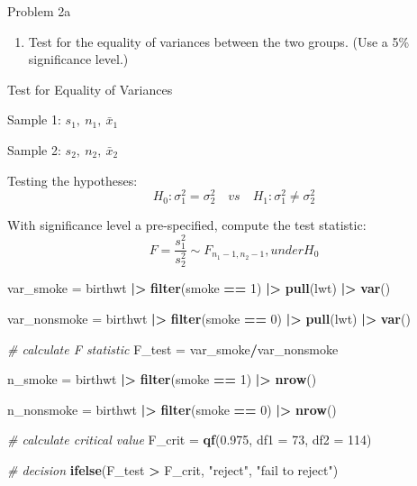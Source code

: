 \documentclass[
]{article}
\newenvironment{Shaded}{\begin{snugshade}}{\end{snugshade}}
\newcommand{\AttributeTok}[1]{\textcolor[rgb]{0.13,0.29,0.53}{#1}}
\newcommand{\CommentTok}[1]{\textcolor[rgb]{0.56,0.35,0.01}{\textit{#1}}}
\newcommand{\DecValTok}[1]{\textcolor[rgb]{0.00,0.00,0.81}{#1}}
\newcommand{\FloatTok}[1]{\textcolor[rgb]{0.00,0.00,0.81}{#1}}
\newcommand{\FunctionTok}[1]{\textcolor[rgb]{0.13,0.29,0.53}{\textbf{#1}}}
\newcommand{\NormalTok}[1]{#1}
\newcommand{\OtherTok}[1]{\textcolor[rgb]{0.56,0.35,0.01}{#1}}
\newcommand{\SpecialCharTok}[1]{\textcolor[rgb]{0.81,0.36,0.00}{\textbf{#1}}}
\newcommand{\StringTok}[1]{\textcolor[rgb]{0.31,0.60,0.02}{#1}}
\providecommand{\tightlist}{%
  \setlength{\itemsep}{0pt}\setlength{\parskip}{0pt}}
\begin{document}
Problem 2a

\begin{enumerate}
\def\labelenumi{\alph{enumi})}
\tightlist
\item
  Test for the equality of variances between the two groups. (Use a 5\%
  significance level.)
\end{enumerate}

Test for Equality of Variances

Sample 1: \(s_1, ~ n_1, ~ \bar{x}_1\)

Sample 2: \(s_2, ~ n_2, ~ \bar{x}_2\)

Testing the hypotheses:
\[  H_0 : \sigma_1^2 = \sigma_2^2 \quad vs \quad H_1 : \sigma_1^2 \ne \sigma_2^2\]

With significance level a pre-specified, compute the test statistic:
\[ F = {\frac{s_1^2}{s_2^2}} \sim F_{n_1-1, n_2-1},under H_0\]

\begin{Shaded}
\begin{Highlighting}[]
\NormalTok{var\_smoke }\OtherTok{=} 
\NormalTok{  birthwt }\SpecialCharTok{|\textgreater{}} 
  \FunctionTok{filter}\NormalTok{(smoke }\SpecialCharTok{==} \DecValTok{1}\NormalTok{) }\SpecialCharTok{|\textgreater{}} 
  \FunctionTok{pull}\NormalTok{(lwt) }\SpecialCharTok{|\textgreater{}}
  \FunctionTok{var}\NormalTok{()}

\NormalTok{var\_nonsmoke }\OtherTok{=} 
\NormalTok{  birthwt }\SpecialCharTok{|\textgreater{}} 
  \FunctionTok{filter}\NormalTok{(smoke }\SpecialCharTok{==} \DecValTok{0}\NormalTok{) }\SpecialCharTok{|\textgreater{}} 
  \FunctionTok{pull}\NormalTok{(lwt) }\SpecialCharTok{|\textgreater{}}
  \FunctionTok{var}\NormalTok{()}

\CommentTok{\# calculate F statistic}
\NormalTok{F\_test }\OtherTok{=}\NormalTok{ var\_smoke}\SpecialCharTok{/}\NormalTok{var\_nonsmoke}

\NormalTok{n\_smoke }\OtherTok{=} 
\NormalTok{  birthwt }\SpecialCharTok{|\textgreater{}} 
  \FunctionTok{filter}\NormalTok{(smoke }\SpecialCharTok{==} \DecValTok{1}\NormalTok{) }\SpecialCharTok{|\textgreater{}} 
  \FunctionTok{nrow}\NormalTok{()}
  
\NormalTok{n\_nonsmoke }\OtherTok{=} 
\NormalTok{  birthwt }\SpecialCharTok{|\textgreater{}} 
  \FunctionTok{filter}\NormalTok{(smoke }\SpecialCharTok{==} \DecValTok{0}\NormalTok{) }\SpecialCharTok{|\textgreater{}} 
  \FunctionTok{nrow}\NormalTok{()}

\CommentTok{\# calculate critical value  }
\NormalTok{F\_crit }\OtherTok{=} \FunctionTok{qf}\NormalTok{(}\FloatTok{0.975}\NormalTok{, }\AttributeTok{df1 =} \DecValTok{73}\NormalTok{, }\AttributeTok{df2 =} \DecValTok{114}\NormalTok{)}

\CommentTok{\# decision}
\FunctionTok{ifelse}\NormalTok{(F\_test }\SpecialCharTok{\textgreater{}}\NormalTok{ F\_crit, }\StringTok{"reject"}\NormalTok{, }\StringTok{"fail to reject"}\NormalTok{)}
\end{Highlighting}
\end{Shaded}
\end{document}
